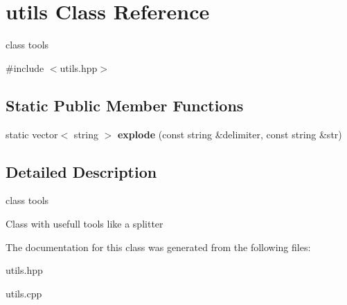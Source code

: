\hypertarget{classutils}{\section{utils Class Reference}
\label{classutils}
}


class tools  




{\ttfamily \#include $<$utils.\-hpp$>$}

\subsection*{Static Public Member Functions}
\begin{DoxyCompactItemize}
\item 
\hypertarget{classutils_a1fbcb70a165ad98fc5234810d2f19fdd}{static vector$<$ string $>$ {\bfseries explode} (const string \&delimiter, const string \&str)}\label{classutils_a1fbcb70a165ad98fc5234810d2f19fdd}

\end{DoxyCompactItemize}


\subsection{Detailed Description}
class tools 

Class with usefull tools like a splitter 

The documentation for this class was generated from the following files\-:\begin{DoxyCompactItemize}
\item 
utils.\-hpp\item 
utils.\-cpp\end{DoxyCompactItemize}
